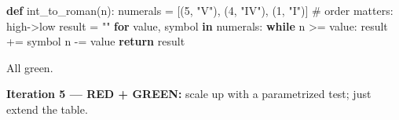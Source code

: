 \documentclass[11pt]{article}
\newenvironment{Shaded}{\begin{snugshade}}{\end{snugshade}}
\newcommand{\CommentTok}[1]{\textcolor[rgb]{0.48,0.49,0.49}{#1}}
\newcommand{\ControlFlowTok}[1]{\textcolor[rgb]{0.99,0.74,0.29}{\textbf{#1}}}
\newcommand{\DecValTok}[1]{\textcolor[rgb]{0.96,0.45,0.00}{#1}}
\newcommand{\KeywordTok}[1]{\textcolor[rgb]{0.81,0.81,0.76}{\textbf{#1}}}
\newcommand{\NormalTok}[1]{\textcolor[rgb]{0.81,0.81,0.76}{#1}}
\newcommand{\OperatorTok}[1]{\textcolor[rgb]{0.81,0.81,0.76}{#1}}
\newcommand{\StringTok}[1]{\textcolor[rgb]{0.96,0.31,0.31}{#1}}
\begin{document}

\begin{Shaded}
\begin{Highlighting}[]
\KeywordTok{def}\NormalTok{ int\_to\_roman(n):}
\NormalTok{    numerals }\OperatorTok{=}\NormalTok{ [(}\DecValTok{5}\NormalTok{, }\StringTok{"V"}\NormalTok{), (}\DecValTok{4}\NormalTok{, }\StringTok{"IV"}\NormalTok{), (}\DecValTok{1}\NormalTok{, }\StringTok{"I"}\NormalTok{)]   }\CommentTok{\# order matters: high{-}\textgreater{}low}
\NormalTok{    result }\OperatorTok{=} \StringTok{""}
    \ControlFlowTok{for}\NormalTok{ value, symbol }\KeywordTok{in}\NormalTok{ numerals:}
        \ControlFlowTok{while}\NormalTok{ n }\OperatorTok{\textgreater{}=}\NormalTok{ value:}
\NormalTok{            result }\OperatorTok{+=}\NormalTok{ symbol}
\NormalTok{            n }\OperatorTok{{-}=}\NormalTok{ value}
    \ControlFlowTok{return}\NormalTok{ result}
\end{Highlighting}
\end{Shaded}

All green.

\textbf{Iteration 5 --- RED + GREEN:} scale up with a parametrized test; just extend the table.

\end{document}
